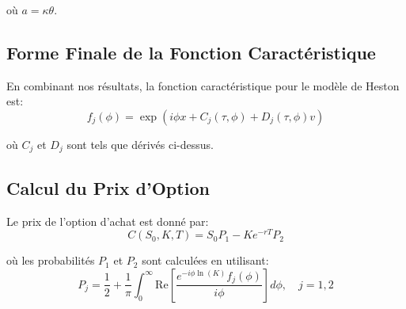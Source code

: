 où $a = \kappa\theta$.

\subsection{Forme Finale de la Fonction Caractéristique}

En combinant nos résultats, la fonction caractéristique pour le modèle de Heston est:
\begin{equation}
f_j(\phi) = \exp\left(i\phi x + C_j(\tau, \phi) + D_j(\tau, \phi)v\right)
\end{equation}

où $C_j$ et $D_j$ sont tels que dérivés ci-dessus.

\subsection{Calcul du Prix d'Option}

Le prix de l'option d'achat est donné par:
\begin{equation}
C(S_0, K, T) = S_0 P_1 - Ke^{-rT} P_2
\end{equation}

où les probabilités $P_1$ et $P_2$ sont calculées en utilisant:
\begin{equation}
P_j = \frac{1}{2} + \frac{1}{\pi}\int_0^{\infty}\text{Re}\left[\frac{e^{-i\phi\ln(K)}f_j(\phi)}{i\phi}\right]d\phi, \quad j=1,2
\end{equation}


